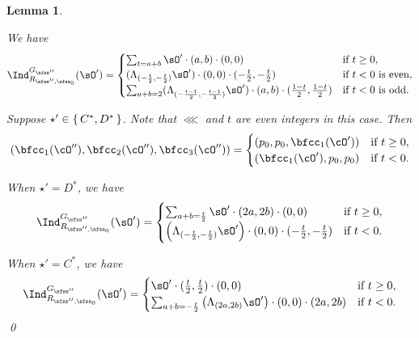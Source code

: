 \documentclass[12pt,a4paper]{amsart}
\numberwithin{equation}{section}
\newtheorem{lem}[thm]{Lemma}
\theoremstyle{remark}
\def\cOp{\cO^{\prime}}
\def\cOpp{\cO^{\prime\prime}}
\begin{document}
\begin{lem}
\begin{enuma}
    We have
    \[
      \indsss(\sOp) =
      \begin{cases}
        \sum_{t=\po+\qo}\sOp\cdot (\po,\qo)\cdot (0,0)
           & \text{if $t\geq 0$}, \\
        (\Lambda_{(-\frac{t}{2},-\frac{t}{2})}\sOp) \cdot (0,0)
        \cdot (-\frac{t}{2},-\frac{t}{2})
         & \text{if $t < 0$ is even},  \\
        \sum_{\po+\qo = 2}(\Lambda_{(-\frac{t-1}{2},-\frac{t-1}{2})}\sOp)
        \cdot (\po,\qo) \cdot (\frac{1-t}{2},\frac{1-t}{2})
            & \text{if $t<0$ is odd}.             \\
      \end{cases}
    \]
    \item Suppose $\star' \in \set{C^*,D^*}$.
    Note that  $\lll$ and $t$ are even integers in this case.
    Then
    \[
      (\bfcc_1(\cOpp), \bfcc_2(\cOpp),\bfcc_3(\cOpp))
      =\begin{cases}
        (\lll,\lll,\bfcc_1(\cOp))     & \text{if $t\geq 0$}, \\
        (\bfcc_1(\cOp),\lll,\lll)     & \text{if $t<0$}.             \\
      \end{cases}
    \]

    When $\star' = D^*$, we have
    \[
      \indsss(\sOp) =
      \begin{cases}
        \sum_{\po+\qo =\frac{t}{2}}
        \sOp\cdot (2\po,2\qo)\cdot (0,0)
         & \text{if $t \geq 0$}, \\
        \left(\Lambda_{(-\frac{t}{2},-\frac{t}{2})} \sOp \right)\cdot (0,0)
        \cdot (-\frac{t}{2},-\frac{t}{2})
         & \text{if $t < 0$}. \\
      \end{cases}
    \]

    When $\star'=C^*$, we have
    \[
      \indsss(\sOp) =
      \begin{cases}
        \sOp\cdot (\frac{t}{2},\frac{t}{2}) \cdot (0,0)
         & \text{if $t \geq 0$}, \\
         \sum_{\po+\qo = -\frac{t}{2}}
        \left(\Lambda_{(2\po,2\qo)} \sOp \right)\cdot (0,0)
        \cdot (2\po,2\qo)
         & \text{if $t < 0$}. \\
      \end{cases}
    \]
    \qed
  \end{enuma}
\end{lem}
\end{document}
